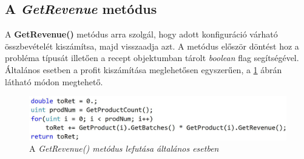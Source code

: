 \subsection{A \textit{GetRevenue} metódus} \label{getRevenue}
A \textbf{GetRevenue()} metódus arra szolgál, hogy adott konfiguráció várható összbevételét kiszámítsa, majd visszaadja azt. A metódus először döntést hoz a probléma típusát illetően a recept objektumban tárolt \textit{boolean} flag segítségével. Általános esetben a profit kiszámítása meglehetősen egyszerűen, a \ref{getRevenueNonStoch} ábrán látható módon megtehető. 
\begin{figure}[H]
\begin{center}
\includegraphics[scale=0.38]{getRevenueNonStoch}
\caption{A \textit{GetRevenue() metódus lefutása általános esetben}}
\label{getRevenueNonStoch}
\end{center}
\end{figure}
